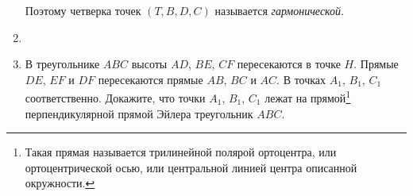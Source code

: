 \begin{enumerate}[resume*]
{            Поэтому четверка точек  $\left( T, B, D, C \right) $ называется \emph{гармонической}.
        }
    \item {}

    \item В треугольнике $ABC$ высоты $AD$, $BE$, $CF$ пересекаются в точке $H$. Прямые $DE$, $EF$ и $DF$ пересекаются прямые $AB$, $BC$ и $AC$. В точках $A_1$, $B_1$, $C_1$ соответственно. Докажите, что точки $A_1$, $B_1$, $C_1$ лежат на прямой\footnote{Такая прямая называется трилинейной полярой ортоцентра, или ортоцентрической осью, или центральной линией центра описанной окружности.} перпендикулярной прямой Эйлера треугольник $ABC$.

\end{enumerate}
